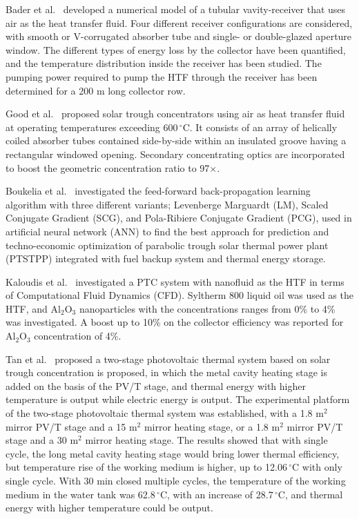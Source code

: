 Bader et al.~\cite{Bader2015} developed a numerical model of a tubular vavity-receiver that uses air as the heat transfer fluid. Four different receiver configurations are considered, with smooth or V-corrugated absorber tube and single- or double-glazed aperture window. The different types of energy loss by the collector have been quantified, and the temperature distribution inside the receiver has been studied. The pumping power required to pump the HTF through the receiver has been determined for a 200 m long collector row.

Good et al.~\cite{Good2015} proposed solar trough concentrators using air as heat transfer fluid at operating temperatures exceeding 600$\,^\circ$C. It consists of an array of helically coiled absorber tubes contained side-by-side within an insulated groove having a rectangular windowed opening. Secondary concentrating optics are incorporated to boost the geometric concentration ratio to 97$\times$.

Boukelia et al.~\cite{Boukelia2016} investigated the feed-forward back-propagation learning algorithm with three different variants; Levenberge Marguardt (LM), Scaled Conjugate Gradient (SCG), and Pola-Ribiere Conjugate Gradient (PCG), used in artificial neural network (ANN) to find the best approach for prediction and techno-economic optimization of parabolic trough solar thermal power plant (PTSTPP) integrated with fuel backup system and thermal energy storage.

Kaloudis et al.~\cite{Kaloudis2016} investigated a PTC system with nanofluid as the HTF in terms of Computational Fluid Dynamics (CFD). Syltherm 800 liquid oil was used as the HTF, and Al$_2$O$_3$ nanoparticles with the concentrations ranges from 0\% to 4\% was investigated. A boost up to 10\% on the collector efficiency was reported for Al$_2$O$_3$ concentration of 4\%.

Tan et al.~\cite{Tan2014} proposed a two-stage photovoltaic thermal system based on solar trough concentration is proposed, in which the metal cavity heating stage is added on the basis of the PV/T stage, and thermal energy with higher temperature is output while electric energy is output. The experimental platform of the two-stage photovoltaic thermal system was established, with a 1.8 m$^2$ mirror PV/T stage and a 15 m$^2$ mirror heating stage, or a 1.8 m$^2$ mirror PV/T stage and a 30 m$^2$ mirror heating stage. The results showed that with single cycle, the long metal cavity heating stage would bring lower thermal efficiency, but temperature rise of the working medium is higher, up to 12.06$\,^\circ$C with only single cycle. With 30 min closed multiple cycles, the temperature of the working medium in the water tank was 62.8$\,^\circ$C, with an increase of 28.7$\,^\circ$C, and thermal energy with higher temperature could be output.

